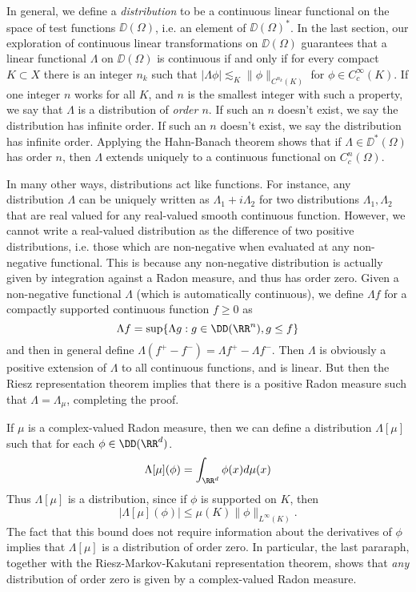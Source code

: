 In general, we define a \emph{distribution} to be a continuous linear functional on the space of test functions $\DD(\Omega)$, i.e. an element of $\DD(\Omega)^*$. In the last section, our exploration of continuous linear transformations on $\DD(\Omega)$ guarantees that a linear functional $\Lambda$ on $\DD(\Omega)$ is continuous if and only if for every compact $K \subset X$ there is an integer $n_k$ such that $|\Lambda \phi| \lesssim_K \| \phi \|_{C^{n_k}(K)}$ for $\phi \in C_c^\infty(K)$. If one integer $n$ works for all $K$, and $n$ is the smallest integer with such a property, we say that $\Lambda$ is a distribution of \emph{order $n$}. If such an $n$ doesn't exist, we say the distribution has infinite order. If such an $n$ doesn't exist, we say the distribution has infinite order. Applying the Hahn-Banach theorem shows that if $\Lambda \in \DD^*(\Omega)$ has order $n$, then $\Lambda$ extends uniquely to a continuous functional on $C^n_c(\Omega)$.

In many other ways, distributions act like functions. For instance, any distribution $\Lambda$ can be uniquely written as $\Lambda_1 + i \Lambda_2$ for two distributions $\Lambda_1, \Lambda_2$ that are real valued for any real-valued smooth continuous function. However, we cannot write a real-valued distribution as the difference of two positive distributions, i.e. those which are non-negative when evaluated at any non-negative functional. This is because any non-negative distribution is actually given by integration against a Radon measure, and thus has order zero. Given a non-negative functional $\Lambda$ (which is automatically continuous),  we define $\Lambda f$ for a compactly supported continuous function $f \geq 0$ as
%
\[ \Lambda f = \sup \{ \Lambda g: g \in \DD(\RR^n), g \leq f \} \]
%
and then in general define $\Lambda (f^+ - f^-) = \Lambda f^+ - \Lambda f^-$. Then $\Lambda$ is obviously a positive extension of $\Lambda$ to all continuous functions, and is linear. But then the Riesz representation theorem implies that there is a positive Radon measure such that $\Lambda = \Lambda_\mu$, completing the proof.

\begin{example}
    If $\mu$ is a complex-valued Radon measure, then we can define a distribution $\Lambda[\mu]$ such that for each $\phi \in \DD(\RR^d)$.
    \[ \Lambda[\mu](\phi) = \int_{\RR^d} \phi(x) d\mu(x) \]
    Thus $\Lambda[\mu]$ is a distribution, since if $\phi$ is supported on $K$, then
    \[ |\Lambda[\mu](\phi)| \leq \mu(K) \| \phi \|_{L^\infty(K)}. \]
    The fact that this bound does not require information about the derivatives of $\phi$ implies that $\Lambda[\mu]$ is a distribution of order zero. In particular, the last pararaph, together with the Riesz-Markov-Kakutani representation theorem, shows that \emph{any} distribution of order zero is given by a complex-valued Radon measure.
\end{example}

